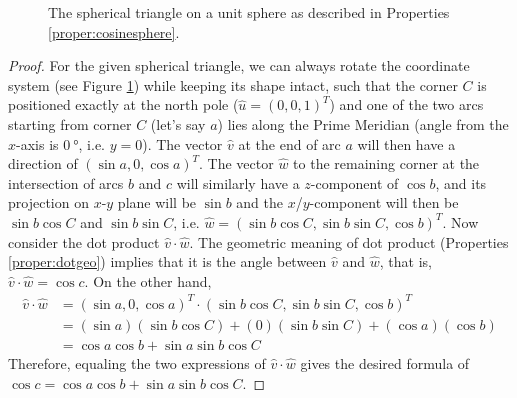 \begin{figure}
\caption{The spherical triangle on a unit sphere as described in Properties \ref{proper:cosinesphere}.}
\label{fig:cosinesphere}
\end{figure}
\begin{proof}
For the given spherical triangle, we can always rotate the coordinate system (see Figure \ref{fig:cosinesphere}) while keeping its shape intact, such that the corner $C$ is positioned exactly at the north pole ($\hat{u} = (0,0,1)^T$) and one of the two arcs starting from corner $C$ (let's say $a$) lies along the Prime Meridian (angle from the $x$-axis is $\SI{0}{\degree}$, i.e. $y = 0$). The vector $\hat{v}$ at the end of arc $a$ will then have a direction of $(\sin a, 0, \cos a)^T$. The vector $\hat{w}$ to the remaining corner at the intersection of arcs $b$ and $c$ will similarly have a $z$-component of $\cos b$, and its projection on $x$-$y$ plane will be $\sin b$ and the $x$/$y$-component will then be $\sin b \cos C$ and $\sin b \sin C$, i.e. $\hat{w} = (\sin b \cos C, \sin b \sin C, \cos b)^T$. Now consider the dot product $\hat{v} \cdot \hat{w}$. The geometric meaning of dot product (Properties \ref{proper:dotgeo}) implies that it is the angle between $\hat{v}$ and $\hat{w}$, that is, $\hat{v} \cdot \hat{w} = \cos c$. On the other hand,
\begin{align*}
\hat{v} \cdot \hat{w} &= (\sin a, 0, \cos a)^T \cdot (\sin b \cos C, \sin b \sin C, \cos b)^T \\
&= (\sin a) (\sin b \cos C) + (0) (\sin b \sin C) + (\cos a) (\cos b) \\
&= \cos a \cos b + \sin a \sin b \cos C 
\end{align*}
Therefore, equaling the two expressions of $\hat{v} \cdot \hat{w}$ gives the desired formula of $\cos c = \cos a \cos b + \sin a \sin b \cos C$.
\end{proof}

